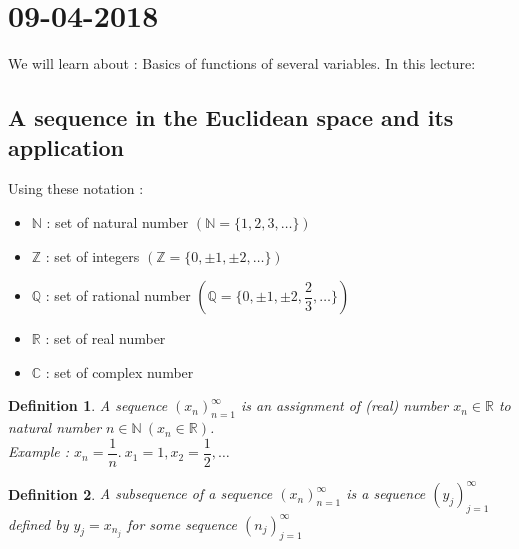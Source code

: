 \documentclass[a4paper,10pt]{article}
\newtheorem{defi}{Definition}[]
\begin{document}
\section{09-04-2018}
We will learn about : Basics of functions of several variables.
In this lecture:

\subsection{A sequence in the Euclidean space and its application}
Using these notation :
\begin{itemize}
	\item $ \mathbb{N} $ : set of natural number $ (\mathbb{N} = \{1,2,3, \dots\} )$
	\item $ \mathbb{Z} $ : set of integers $ (\mathbb{Z} = \{0,\pm 1,\pm 2, \dots\} )$
	\item $ \mathbb{Q} $ : set of rational number $ (\mathbb{Q} = \{0,\pm 1, \pm 2, \dfrac{2}{3}, \dots\} )$
	\item $ \mathbb{R} $ : set of real number
	\item $ \mathbb{C} $ : set of complex number
\end{itemize}

\begin{defi}
	A sequence $ (x_{n})_{n=1}^{\infty} $ is an assignment of (real) number $ x_{n} \in \mathbb{R} $ to natural number $ n \in \mathbb{N} \ (x_{n} \in \mathbb{R})$.\\
	Example : $ x_{n}=\dfrac{1}{n}. \ x_{1}=1,x_{2}=\dfrac{1}{2}, \dots $
\end{defi}

\begin{defi}
	A subsequence of a sequence $ (x_{n})_{n=1}^{\infty} $  is a sequence $ (y_{j})_{j=1}^{\infty} $ defined by $ y_{j}=x_{n_{j}} $ for some sequence $ (n_{j})_{j=1}^{\infty} $
\end{defi}
\end{document}
